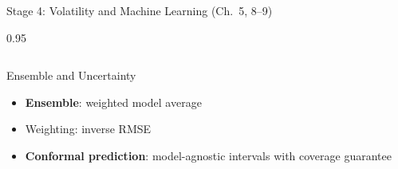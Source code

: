 \documentclass[9pt, aspectratio=169, t]{beamer}
\begin{document}
\begin{frame}{Stage 4: Volatility and Machine Learning (Ch.\ 5, 8--9)}
\begin{cminipage}{0.95\textwidth}
{\begin{columns}[T]
            \vspace{0.1cm}

            \begin{block}{Ensemble and Uncertainty}
                \begin{itemize}\setlength{\itemsep}{0pt}
                    \item \textbf{Ensemble}: weighted model average
                    \item Weighting: inverse RMSE
                    \item \textbf{Conformal prediction}: model-agnostic intervals with coverage guarantee
                \end{itemize}
            \end{block}
        \end{columns}
        }
    \end{cminipage}
\end{frame}
\end{document}
